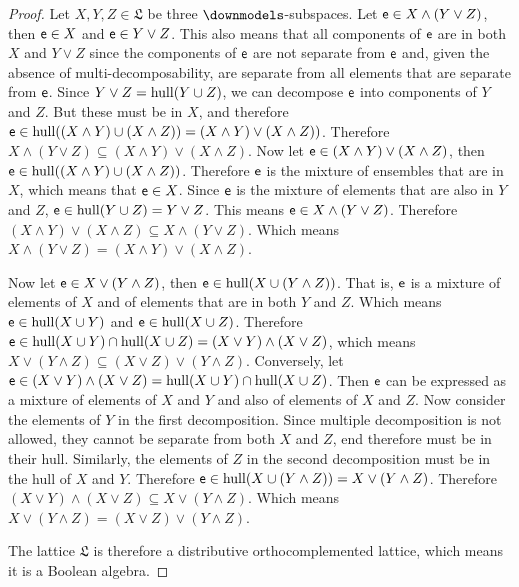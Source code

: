 \begin{proof}
	Let $X,Y,Z \in \mathfrak{L}$ be three $\separate$-subspaces. Let $\mathsf{e} \in X \wedge (Y \vee Z)$, then $\mathsf{e} \in X$ and $\mathsf{e} \in Y \vee Z$. This also means that all components of $\mathsf{e}$ are in both $X$ and $Y \vee Z$ since the components of $\mathsf{e}$ are not separate from $\mathsf{e}$ and, given the absence of multi-decomposability, are separate from all elements that are separate from $\mathsf{e}$. Since $Y \vee Z = \mathrm{hull}(Y \cup Z)$, we can decompose $\mathsf{e}$ into components of $Y$ and $Z$. But these must be in $X$, and therefore $\mathsf{e} \in \mathrm{hull}((X \wedge Y) \cup (X \wedge Z) ) = (X \wedge Y) \vee (X \wedge Z) )$. Therefore $X \wedge (Y \vee Z) \subseteq (X \wedge Y) \vee (X \wedge Z)$. Now let $\mathsf{e} \in (X \wedge Y) \vee (X \wedge Z)$, then $\mathsf{e} \in \mathrm{hull}((X \wedge Y) \cup (X \wedge Z) )$. Therefore $\mathsf{e}$ is the mixture of ensembles that are in $X$, which means that $\mathsf{e} \in X$. Since $\mathsf{e}$ is the mixture of elements that are also in $Y$ and $Z$, $\mathsf{e} \in \mathrm{hull}(Y \cup Z) = Y \vee Z$. This means $\mathsf{e} \in X \wedge (Y \vee Z)$. Therefore $(X \wedge Y) \vee (X \wedge Z) \subseteq X \wedge (Y \vee Z)$. Which means $X \wedge (Y \vee Z) = (X \wedge Y) \vee (X \wedge Z)$.
	
	Now let $\mathsf{e} \in X \vee (Y \wedge Z)$, then $\mathsf{e} \in \mathrm{hull}(X \cup (Y \wedge Z) )$. That is, $\mathsf{e}$ is a mixture of elements of $X$ and of elements that are in both $Y$ and $Z$. Which means $\mathsf{e} \in \mathrm{hull}(X \cup Y)$ and $\mathsf{e} \in \mathrm{hull}(X \cup Z)$. Therefore $\mathsf{e} \in \mathrm{hull}(X \cup Y) \cap \mathrm{hull}(X \cup Z) = (X \vee Y) \wedge (X \vee Z)$, which means $X \vee (Y \wedge Z) \subseteq (X \vee Z) \vee (Y \wedge Z)$. Conversely, let $\mathsf{e} \in (X \vee Y) \wedge (X \vee Z) = \mathrm{hull}(X \cup Y) \cap \mathrm{hull}(X \cup Z)$. Then $\mathsf{e}$ can be expressed as a mixture of elements of $X$ and $Y$ and also of elements of $X$ and $Z$. Now consider the elements of $Y$ in the first decomposition. Since multiple decomposition is not allowed, they cannot be separate from both $X$ and $Z$, end therefore must be in their hull. Similarly, the elements of $Z$ in the second decomposition must be in the hull of $X$ and $Y$. Therefore $\mathsf{e} \in \mathrm{hull}(X \cup (Y \wedge Z) ) = X \vee (Y \wedge Z)$. Therefore $(X \vee Y) \wedge (X \vee Z) \subseteq X \vee (Y \wedge Z)$. Which means $X \vee (Y \wedge Z) = (X \vee Z) \vee (Y \wedge Z)$.
	
	The lattice $\mathfrak{L}$ is therefore a distributive orthocomplemented lattice, which means it is a Boolean algebra.
\end{proof}

